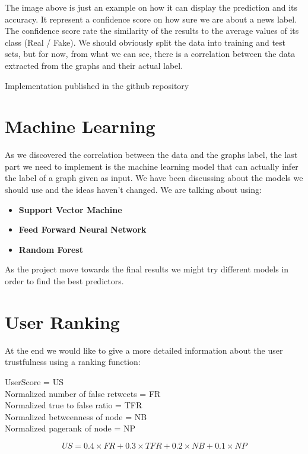 \documentclass[11pt,a4paper]{article}
\begin{document}
The image above is just an example on how it can display the prediction and its accuracy.
It represent a confidence score on how sure we are about a news label. The confidence score rate the similarity of the results to the average values of its class (Real / Fake).
We should obviously split the data into training and test sets, but for now, from what we can see, there is a correlation between the data extracted from the graphs and their actual label.

Implementation published in the github repository\cite{github}

\section*{Machine Learning}

As we discovered the correlation between the data and the graphs label, the last part we need to implement is the machine learning model that can actually infer the label of a graph given as input. We have been discussing about the models we should use and the ideas haven't changed.
We are talking about using:
\begin{itemize}
	\setlength\itemsep{-0.3em}
	\item \textbf{Support Vector Machine}
	\item \textbf{Feed Forward Neural Network}
	\item \textbf{Random Forest}
\end{itemize}

As the project move towards the final results we might try different models in order to find the best predictors.

\section*{User Ranking}

At the end we would like to give a more detailed information about the user trustfulness using a ranking function:
\begin{center}
	UserScore = US \\
	Normalized number of false retweets = FR \\
	Normalized true to false ratio = TFR \\
	Normalized betweenness of node = NB \\
	Normalized pagerank of node = NP \\
\end{center}

\begin{equation}
	US = 0.4 \times FR + 0.3 \times TFR + 0.2 \times NB + 0.1 \times NP
\end{equation}
\end{document}
